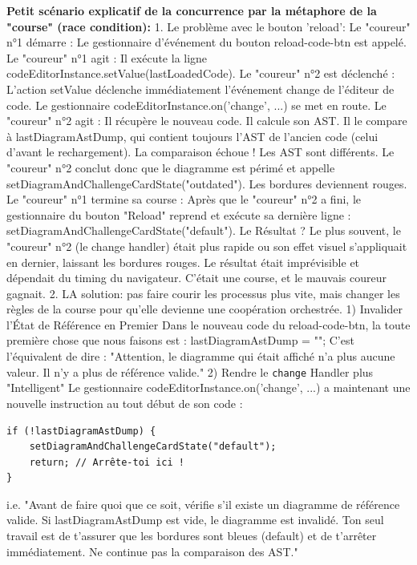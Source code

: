\documentclass[11pt,a4paper]{article}
\begin{document}
\textbf{Petit scénario explicatif de la concurrence par la métaphore de la "course" (race condition):}
1. Le problème avec le bouton 'reload':
Le "coureur" n°1 démarre : Le gestionnaire d'événement du bouton reload-code-btn est appelé.
Le "coureur" n°1 agit : Il exécute la ligne codeEditorInstance.setValue(lastLoadedCode).
Le "coureur" n°2 est déclenché : L'action setValue déclenche immédiatement l'événement change de l'éditeur de code. Le gestionnaire codeEditorInstance.on('change', ...) se met en route.
Le "coureur" n°2 agit :
Il récupère le nouveau code.
Il calcule son AST.
Il le compare à lastDiagramAstDump, qui contient toujours l'AST de l'ancien code (celui d'avant le rechargement).
La comparaison échoue ! Les AST sont différents.
Le "coureur" n°2 conclut donc que le diagramme est périmé et appelle setDiagramAndChallengeCardState("outdated"). Les bordures deviennent rouges.
Le "coureur" n°1 termine sa course : Après que le "coureur" n°2 a fini, le gestionnaire du bouton "Reload" reprend et exécute sa dernière ligne : setDiagramAndChallengeCardState("default").
Le Résultat ? Le plus souvent, le "coureur" n°2 (le change handler) était plus rapide ou son effet visuel s'appliquait en dernier, laissant les bordures rouges. Le résultat était imprévisible et dépendait du timing du navigateur. C'était une course, et le mauvais coureur gagnait.
2. LA solution: pas faire courir les processus plus vite, mais changer les règles de la course pour qu'elle devienne une coopération orchestrée.
1) Invalider l'État de Référence en Premier
Dans le nouveau code du reload-code-btn, la toute première chose que nous faisons est :
lastDiagramAstDump = "";
C'est l'équivalent de dire : "Attention, le diagramme qui était affiché n'a plus aucune valeur. Il n'y a plus de référence valide."
2) Rendre le \texttt{change} Handler plus "Intelligent"
Le gestionnaire codeEditorInstance.on('change', ...) a maintenant une nouvelle instruction au tout début de son code :
\begin{verbatim}
if (!lastDiagramAstDump) {
    setDiagramAndChallengeCardState("default");
    return; // Arrête-toi ici !
}
\end{verbatim}
i.e. "Avant de faire quoi que ce soit, vérifie s'il existe un diagramme de référence valide. Si lastDiagramAstDump est vide, le diagramme est invalidé. Ton seul travail est de t'assurer que les bordures sont bleues (default) et de t'arrêter immédiatement. Ne continue pas la comparaison des AST."
\end{document}
